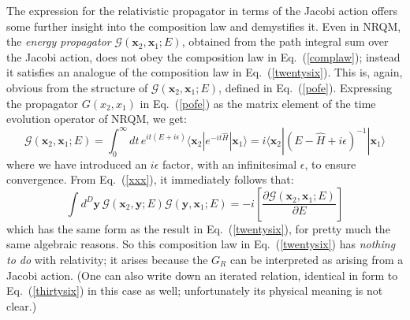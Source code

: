 \documentclass[12pt]{article}
\def\eq#1{{Eq.~(\ref{#1})}}
\def\b#1{{\bm#1}}
\def\bk#1#2#3{{\langle #1|#2|#3\rangle}}  %
\begin{document}
The expression for the  relativistic propagator in terms of the Jacobi action offers some further insight into the composition law and demystifies it. Even in NRQM, the \textit{energy propagator} $\mathcal{G}(\bm{x}_2,\bm{x}_1;E)$, obtained from the path integral sum over the  Jacobi action, does not obey the composition law in \eq{complaw}; instead it satisfies an analogue of the composition law in 
\eq{twentysix}.
This is, again, obvious from the structure of 
$\mathcal{G}(\bm{x}_2,\bm{x}_1;E)$, defined in \eq{pofe}. Expressing the propagator $G(x_2,x_1)$ in \eq{pofe} as the matrix element of the time evolution operator of NRQM, we get: 
\begin{equation}
 \mathcal{G}(\b x_2, \b x_1;E) = \int_0^\infty dt \, e^{it(E+i\epsilon)}\bk{\b x_2}{e^{-it\hat H}}{\b x_1} 
= i\bk{\b x_2}{(E - \hat H +i\epsilon)^{-1}}{\b x_1}
\label{xxx}
\end{equation} 
where we have introduced an $i\epsilon$ factor, with an infinitesimal $\epsilon$, to ensure convergence.
From  \eq{xxx}, it immediately follows that:
\begin{equation}
 \int d^D\b y \, \mathcal{G}(\b x_2, \b y; E) \mathcal{G}(\b y, \b x_1;E) =  -i\left[\frac{\partial  \mathcal{G}(\b x_2, \b x_1;E)}{\partial E}\right]
\end{equation} 
which has the same form as the result in \eq{twentysix}, for pretty much the same algebraic reasons. So this composition law in \eq{twentysix} has \textit{nothing to do} with relativity; it arises because the $G_R$ can be interpreted as arising from a Jacobi action. (One can also write down an iterated relation, identical in form to \eq{thirtysix} in this case as well; unfortunately its physical meaning is not clear.)
 
\end{document}
